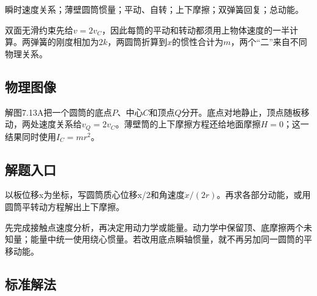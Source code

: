 \documentclass[UTF8,fontset=fandol,a4paper,11pt]{ctexart}
\begin{document}
瞬时速度关系；薄壁圆筒惯量；平动、自转；上下摩擦；双弹簧回复；总动能。

双面无滑约束先给$v=2v_C$，因此每筒的平动和转动都须用上物体速度的一半计算。两弹簧的刚度相加为$2k$，两圆筒折算到$x$的惯性合计为$m$，两个“二”来自不同物理关系。




\subsection*{物理图像}

解图7.13A把一个圆筒的底点$P$、中心$C$和顶点$Q$分开。底点对地静止，顶点随板移动，两处速度关系给$v_Q=2v_C$。薄壁筒的上下摩擦方程还给地面摩擦$H=0$；这一结果同时使用$I_C=mr^2$。




\subsection*{解题入口}

以板位移x为坐标，写圆筒质心位移x/2和角速度\(\dot x/(2r)\)。再求各部分动能，或用圆筒平转动方程解出上下摩擦。

先完成接触点速度分析，再决定用动力学或能量。动力学中保留顶、底摩擦两个未知量；能量中统一使用绕心惯量。若改用底点瞬轴惯量，就不再另加同一圆筒的平移动能。





\subsection*{标准解法}
\end{document}
